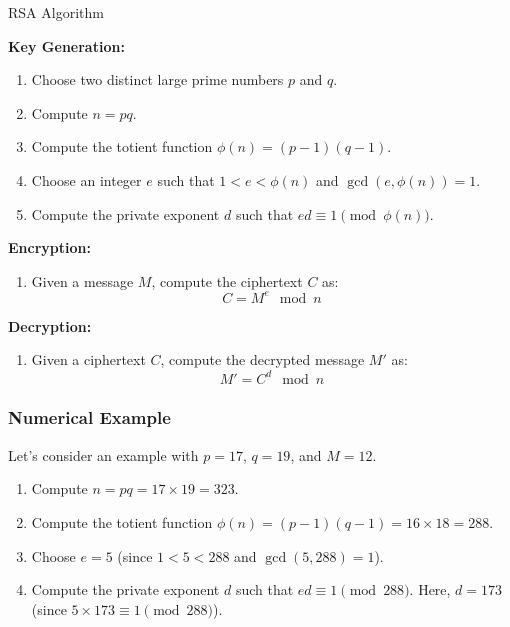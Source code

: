 \documentclass{article}
\begin{document}
\begin{algorithm}[H]
\caption{RSA Algorithm}

\textbf{Key Generation:}
\begin{enumerate}
    \item Choose two distinct large prime numbers \( p \) and \( q \).
    \item Compute \( n = pq \).
    \item Compute the totient function \( \phi(n) = (p-1)(q-1) \).
    \item Choose an integer \( e \) such that \( 1 < e < \phi(n) \) and \( \gcd(e, \phi(n)) = 1 \).
    \item Compute the private exponent \( d \) such that \( ed \equiv 1 \pmod{\phi(n)} \).
\end{enumerate}

\textbf{Encryption:}
\begin{enumerate}
    \item Given a message \( M \), compute the ciphertext \( C \) as:
    \[ C = M^e \mod n \]
\end{enumerate}

\textbf{Decryption:}
\begin{enumerate}
    \item Given a ciphertext \( C \), compute the decrypted message \( M' \) as:
    \[ M' = C^d \mod n \]
\end{enumerate}

\end{algorithm}

\subsubsection{Numerical Example}
Let's consider an example with \( p = 17 \), \( q = 19 \), and \( M = 12 \).

\begin{enumerate}
    \item Compute \( n = pq = 17 \times 19 = 323 \).
    \item Compute the totient function \( \phi(n) = (p-1)(q-1) = 16 \times 18 = 288 \).
    \item Choose \( e = 5 \) (since \( 1 < 5 < 288 \) and \( \gcd(5, 288) = 1 \)).
    \item Compute the private exponent \( d \) such that \( ed \equiv 1 \pmod{288} \). Here, \( d = 173 \) (since \( 5 \times 173 \equiv 1 \pmod{288} \)).
\end{enumerate}
\end{document}
